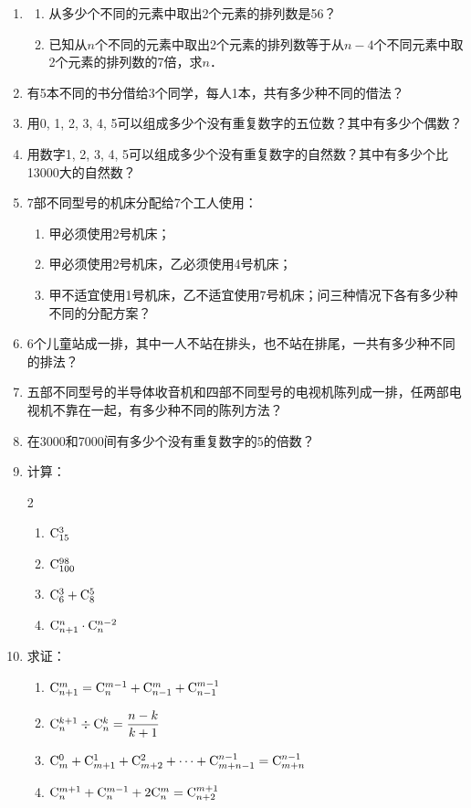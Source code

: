 \begin{enumerate}
\item \begin{enumerate}[(1)]
    \item 从多少个不同的元素中取出2个元素的排列数是56？
    \item 已知从$n$个不同的元素中取出2个元素的排列数等于从$n-4$个不同元素中取2个元素的排列数的7倍，求$n$．
\end{enumerate}
\item 有5本不同的书分借给3个同学，每人1本，共有多少种不同的借法？
\item 用0, 1, 2, 3, 4, 5可以组成多少个没有重复数字的五位数？其中有多少个偶数？
\item 用数字1, 2, 3, 4, 5可以组成多少个没有重复数字的自然数？其中有多少个比13000大的自然数？
\item 7部不同型号的机床分配给7个工人使用：
\begin{enumerate}[(1)]
\item 甲必须使用2号机床；
\item 甲必须使用2号机床，乙必须使用4号机床；
\item 甲不适宜使用1号机床，乙不适宜使用7号机床；问三种情况下各有多少种不同的分配方案？
\end{enumerate}

\item 6个儿童站成一排，其中一人不站在排头，也不站在排尾，一共有多少种不同的排法？
\item 五部不同型号的半导体收音机和四部不同型号的电视机陈列成一排，任两部电视机不靠在一起，有多少种不同的陈列方法？
\item 在3000和7000间有多少个没有重复数字的5的倍数？

\item 计算：
\begin{multicols}{2}
\begin{enumerate}[(1)]
    \item ${\rm C}^{3}_{15}$
    \item ${\rm C}^{98}_{100}$
    \item ${\rm C}^{3}_{6}+{\rm C}^{5}_{8}$
    \item ${\rm C}^{n}_{n+1}\cdot {\rm C}^{n-2}_{n}$
\end{enumerate}
\end{multicols}

\item 求证：
\begin{enumerate}[(1)]
    \item ${\rm C}^{m}_{n+1}={\rm C}^{m-1}_{n}+{\rm C}^{m}_{n-1}+{\rm C}^{m-1}_{n-1}$
    \item ${\rm C}^{k+1}_{n}\div {\rm C}^{k}_{n}=\dfrac{n-k}{k+1}$
    \item ${\rm C}^{0}_{m}+{\rm C}^{1}_{m+1}+{\rm C}^{2}_{m+2}+\cdots+{\rm C}^{n-1}_{m+n-1}={\rm C}^{n-1}_{m+n}$
    \item ${\rm C}^{m+1}_{n}+{\rm C}^{m-1}_{n}+2{\rm C}^{m}_{n}={\rm C}^{m+1}_{n+2}$
\end{enumerate}


\end{enumerate}
